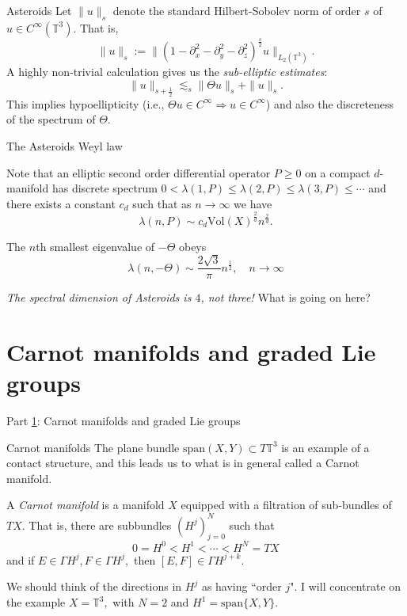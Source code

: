 \documentclass{beamer}
\numberwithin{equation}{section}
\theoremstyle{plain}
\theoremstyle{plain}
\theoremstyle{definition}
\theoremstyle{plain}
\theoremstyle{plain}
\theoremstyle{definition}
\newcommand{\Circ}{\mathbb{T}}
\begin{document}
\begin{frame}{Asteroids}
 Let $\|u\|_{s}$ denote the standard Hilbert-Sobolev norm of order $s$ of $u\in C^\infty(\Circ^3).$ That is,
 \[
      \|u\|_s := \|(1-\partial_x^2-\partial_y^2-\partial_z^2)^{\frac{s}{2}}u\|_{L_2(\Circ^3)}.
 \]
 A highly non-trivial calculation gives us the \emph{sub-elliptic estimates}:
  \[
      \|u\|_{s+\frac12}\lesssim_s \|\Theta u\|_s+\|u\|_s.
  \]
  This implies hypoellipticity (i.e., $\Theta u\in C^\infty \Rightarrow u \in C^\infty$) and also the discreteness of the spectrum of $\Theta.$
\end{frame}

\begin{frame}{The Asteroids Weyl law}
  \begin{theorem}
    Note that an elliptic second order differential operator $P\geq 0$ on a compact $d$-manifold has discrete spectrum $0<\lambda(1,P)\leq \lambda(2,P)\leq \lambda(3,P)\leq\cdots$ and there exists a constant $c_d$ such that as $n\to\infty$ we have
    \[
      \lambda(n,P) \sim c_d\mathrm{Vol}(X)^{\frac2d} n^{\frac{2}{d}}.
    \]
  \end{theorem}
\pause
  \begin{theorem}
    The $n$th smallest eigenvalue of $-\Theta$ obeys
    \[
      \lambda(n,-\Theta) \sim \frac{2\sqrt{3}}{\pi} n^{\frac{1}{2}},\quad n\to\infty
    \]
  \end{theorem}
  \pause
  \emph{The spectral dimension of Asteroids is $4$, not three!}
  What is going on here?
\end{frame}

\section{Carnot manifolds and graded Lie groups}\label{carnot_section}

\begin{frame}
  \Huge{Part \ref{carnot_section}: Carnot manifolds and graded Lie groups}
\end{frame}

\begin{frame}{Carnot manifolds}
  The plane bundle $\mathrm{span}(X,Y)\subset T\Circ^3$ is an example of a contact structure, and this leads us to what is in general called a Carnot manifold.
  \begin{definition}
    A \emph{Carnot manifold} is a manifold $X$ equipped with a filtration of sub-bundles of $TX.$ That is, there are subbundles $(H^j)_{j=0}^N$ such that
    \[
      0 = H^0 < H^1 < \cdots < H^N = TX
    \]
    and if $E\in \Gamma H^j, F\in \Gamma H^j,$ then $[E,F] \in \Gamma H^{j+k}.$
  \end{definition}
  We should think of the directions in $H^j$ as having ``order $j$".
  \pause
  I will concentrate on the example $X = \Circ^3,$ with $N=2$ and $H^1 = \mathrm{span}\{X,Y\}.$
\end{frame}
\end{document}
